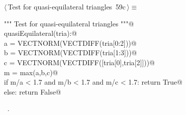\documentclass[11pt,oneside]{article}	%
\begin{document}
\begin{flushleft} \small \label{scrap114}
\protect{}$\langle\,$Test for quasi-equilateral triangles\nobreak\ {\footnotesize 59c}$\,\rangle\equiv$
\vspace{-1ex}
\begin{list}{}{} \item
\mbox{}\verb@""" Test for quasi-equilateral triangles """@\\
\mbox{}\verb@def quasiEquilateral(tria):@\\
\mbox{}\verb@   a = VECTNORM(VECTDIFF(tria[0:2]))@\\
\mbox{}\verb@   b = VECTNORM(VECTDIFF(tria[1:3]))@\\
\mbox{}\verb@   c = VECTNORM(VECTDIFF([tria[0],tria[2]]))@\\
\mbox{}\verb@   m = max(a,b,c)@\\
\mbox{}\verb@   if m/a < 1.7 and m/b < 1.7 and m/c < 1.7: return True@\\
\mbox{}\verb@   else: return False@\\
\mbox{}\verb@@{\NWsep}
\end{list}
\vspace{-1ex}
\footnotesize\addtolength{\baselineskip}{-1ex}
\begin{list}{}{\setlength{\itemsep}{-\parsep}\setlength{\itemindent}{-\leftmargin}}
\item \NWtxtMacroRefIn\ .
\end{list}
\end{flushleft}
\end{document}
